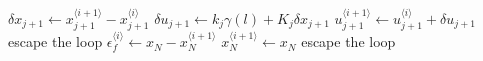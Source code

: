\documentclass{article}
\begin{document}
\begin{algorithm}[t]
\begin{algorithmic}[1]
\State $\delta x_{j+1} \leftarrow x_{j+1}^{\langle i+1 \rangle} - x_{j+1}^{\langle i \rangle}$
\State $\delta u_{j+1} \leftarrow k_j\gamma(l)+K_j\delta x_{j+1}$\textcolor{gray}{}
\State $ u_{j+1}^{\langle i+1\rangle} \leftarrow u_{j+1}^{\langle i\rangle} + \delta u_{j+1}$
\EndFor
{}
escape the loop
\EndIf
\EndFor
\State $\epsilon_f^{\langle i \rangle} \leftarrow x_N - x_N^{\langle i+1 \rangle}$
\State $x_N^{\langle i+1 \rangle} \leftarrow x_N$
escape the loop
\EndIf
\EndFor
\end{algorithmic}
\end{algorithm}
\end{document}
